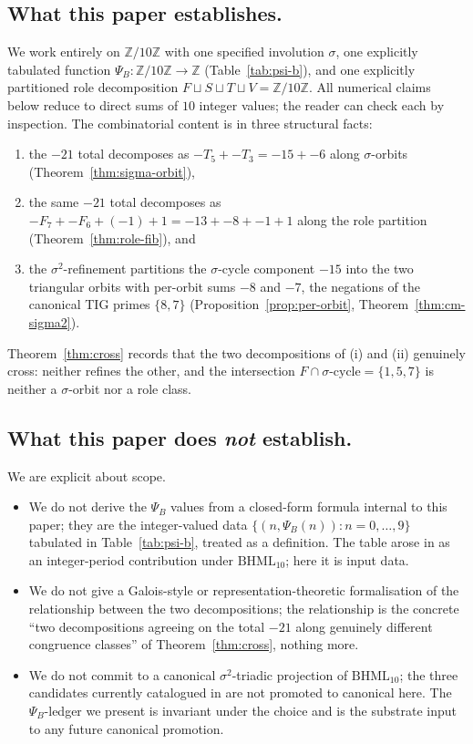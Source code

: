 \documentclass[11pt,reqno]{amsart}
\theoremstyle{plain}
\theoremstyle{definition}
\theoremstyle{remark}
\newcommand{\Z}{\mathbb{Z}}
\newcommand{\BH}{\mathrm{BHML}}
\newcommand{\sig}{\sigma}
\begin{document}
\subsection{What this paper establishes.}
We work entirely on $\Z/10\Z$ with one specified involution $\sig$, one
explicitly tabulated function $\Psi_B : \Z/10\Z \to \Z$
(Table~\ref{tab:psi-b}), and one explicitly partitioned role
decomposition $F \sqcup S \sqcup T \sqcup V = \Z/10\Z$.
All numerical claims below reduce to direct sums of $10$ integer
values; the reader can check each by inspection.
The combinatorial content is in three structural facts:
\begin{enumerate}
\item the $-21$ total decomposes as $-T_5 + -T_3 = -15 + -6$ along
$\sig$-orbits (Theorem~\ref{thm:sigma-orbit}),
\item the same $-21$ total decomposes as $-F_7 + -F_6 + (-1) + 1
= -13 + -8 + -1 + 1$ along the role partition
(Theorem~\ref{thm:role-fib}), and
\item the $\sig^{2}$-refinement partitions the $\sig$-cycle component
$-15$ into the two triangular orbits with per-orbit sums
$-8$ and $-7$, the negations of the canonical TIG primes
$\{8, 7\}$ (Proposition~\ref{prop:per-orbit},
Theorem~\ref{thm:cm-sigma2}).
\end{enumerate}
Theorem~\ref{thm:cross} records that the two decompositions of (i) and
(ii) genuinely cross: neither refines the other, and the intersection
$F \cap \sig\text{-cycle} = \{1, 5, 7\}$ is neither a $\sig$-orbit nor
a role class.

\subsection{What this paper does \emph{not} establish.}
We are explicit about scope.
\begin{itemize}
\item We do not derive the $\Psi_B$ values from a closed-form formula
internal to this paper; they are the integer-valued data
$\{(n, \Psi_B(n)) : n = 0, \ldots, 9\}$ tabulated in
Table~\ref{tab:psi-b}, treated as a definition.  The table arose in
\cite{SandersBridgeWP9} as an integer-period contribution under
$\BH_{10}$; here it is input data.
\item We do not give a Galois-style or representation-theoretic
formalisation of the relationship between the two decompositions;
the relationship is the concrete ``two decompositions agreeing on
the total $-21$ along genuinely different congruence classes'' of
Theorem~\ref{thm:cross}, nothing more.
\item We do not commit to a canonical $\sig^{2}$-triadic projection of
$\BH_{10}$; the three candidates currently catalogued in
\cite{Atlas2026Tiering} are not promoted to canonical here.  The
$\Psi_B$-ledger we present is invariant under the choice and is the
substrate input to any future canonical promotion.
\end{itemize}
\end{document}
